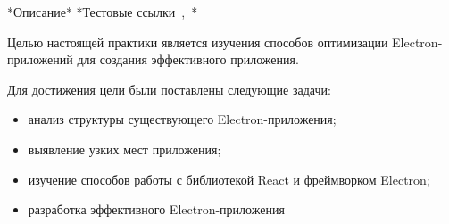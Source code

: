 \intro

*Описание*
*Тестовые ссылки~\cite{test-article},~\cite{test-book}*

Целью настоящей практики является изучения способов оптимизации Electron-приложений для создания эффективного приложения.

Для достижения цели были поставлены следующие задачи:

\begin{itemize}
  \item анализ структуры существующего Electron-приложения;
  \item выявление узких мест приложения;
  \item изучение способов работы с библиотекой React и фреймворком Electron;
  \item разработка эффективного Electron-приложения
\end{itemize}